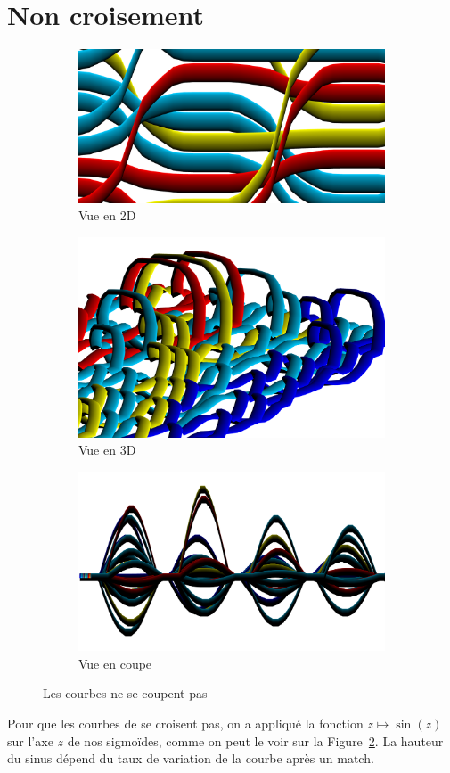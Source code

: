 \documentclass[a4paper,10.5pt]{report}
\begin{document}
    \section{Non croisement}\label{sec:non-croisement}
    \begin{figure}[h!]
        \begin{subfigure}[t]{.5\textwidth}
            \includegraphics[width = .95\linewidth]{../auDessus2D.png}
            \caption{Vue en 2D}
        \end{subfigure}
        \begin{subfigure}[t]{.5\textwidth}
            \includegraphics[width = .95\linewidth]{../auDessus3D.png}
            \caption{Vue en 3D}
        \end{subfigure}
        \begin{subfigure}[t]{\textwidth}
            \centering
            \includegraphics[width = .4\linewidth]{../auDessusCoupe.png}
            \caption{Vue en coupe}\label{sin}
        \end{subfigure}
        \caption{Les courbes ne se coupent pas}
    \end{figure}
    Pour que les courbes de se croisent pas, on a appliqué la fonction $z\mapsto \sin(z)$ sur l'axe $z$ de nos sigmoïdes, comme on peut le voir sur la Figure~\ref{sin}.
    La hauteur du sinus dépend du taux de variation de la courbe après un match.
\end{document}
